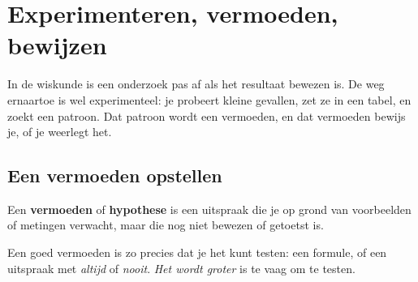 \begin{oefeningen}
\end{oefeningen}

\section{Experimenteren, vermoeden, bewijzen}

In de wiskunde is een onderzoek pas af als het resultaat bewezen is. De weg ernaartoe is wel experimenteel: je probeert kleine gevallen, zet ze in een tabel, en zoekt een patroon. Dat patroon wordt een vermoeden, en dat vermoeden bewijs je, of je weerlegt het.

\subsection{Een vermoeden opstellen}

\begin{theorie}
Een \textbf{\textcolor{accent}{vermoeden}} of \textbf{\textcolor{accent}{hypothese}} is een uitspraak die je op grond van voorbeelden of metingen verwacht, maar die nog niet bewezen of getoetst is.
\end{theorie}

Een goed vermoeden is zo precies dat je het kunt testen: een formule, of een uitspraak met \textit{altijd} of \textit{nooit}. \textit{Het wordt groter} is te vaag om te testen.

